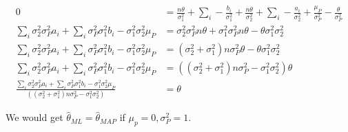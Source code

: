 \documentclass[a4paper]{scrartcl}
\begin{document}
    \begin{align*}
      0 &= \frac{n \theta }{\sigma_1^2} + \sum_i - \frac{b_i}{\sigma_1^2} + \frac{n \theta }{\sigma_2^2} + \sum_i - \frac{a_i}{\sigma_2^2} + \frac{\mu_P}{\sigma_P^2} - \frac{\theta}{\sigma_P^2}\\
      \sum_i \sigma_2^2 \sigma_P^2 a_i + \sum_i \sigma_P^2  \sigma_1^2 b_i - \sigma_1^2 \sigma_2^2 \mu_P&= \sigma_2^2 \sigma_P^2  n\theta + \sigma_1^2 \sigma_P^2  n\theta - \theta \sigma_1^2 \sigma_2^2\\
      \sum_i \sigma_2^2 \sigma_P^2 a_i + \sum_i \sigma_P^2  \sigma_1^2 b_i - \sigma_1^2 \sigma_2^2 \mu_P&= (\sigma_2^2 + \sigma_1^2) n \sigma_P^2 \theta - \theta \sigma_1^2 \sigma_2^2\\
      \sum_i \sigma_2^2 \sigma_P^2 a_i + \sum_i \sigma_P^2  \sigma_1^2 b_i - \sigma_1^2 \sigma_2^2 \mu_P&= ((\sigma_2^2 + \sigma_1^2) n \sigma_P^2 - \sigma_1^2 \sigma_2^2)\theta \\
      \frac{\sum_i \sigma_2^2 \sigma_P^2 a_i + \sum_i \sigma_P^2  \sigma_1^2 b_i - \sigma_1^2 \sigma_2^2 \mu_P}{((\sigma_2^2 + \sigma_1^2) n \sigma_P^2 - \sigma_1^2 \sigma_2^2)}&= \theta
    \end{align*}

    We would get $\hat{\theta}_{ML} = \hat{\theta}_{MAP}$ if $\mu_p = 0, \sigma_P^2 = 1$.
\end{document}
